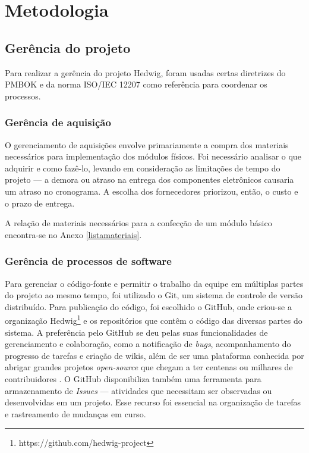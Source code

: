 \chapter{Metodologia}

\section{Gerência do projeto}

Para realizar a gerência do projeto Hedwig, foram usadas certas diretrizes do PMBOK \cite{pmi} e da norma ISO/IEC 12207 \cite{iso12207} como referência para coordenar os processos.

\subsection{Gerência de aquisição}

O gerenciamento de aquisições envolve primariamente a compra dos materiais necessários para implementação dos módulos físicos. Foi necessário analisar o que adquirir e como fazê-lo, levando em consideração as limitações de tempo do projeto --- a demora ou atraso na entrega dos componentes eletrônicos causaria um atraso no cronograma. A escolha dos fornecedores priorizou, então, o custo e o prazo de entrega.

A relação de materiais necessários para a confecção de um módulo básico encontra-se no Anexo \ref{listamateriais}.

\subsection{Gerência de processos de software}

Para gerenciar o código-fonte e permitir o trabalho da equipe em múltiplas partes do projeto ao mesmo tempo, foi utilizado o Git, um sistema de controle de versão distribuído. Para publicação do código, foi escolhido o GitHub, onde criou-se a organização Hedwig\footnote{https://github.com/hedwig-project} e os repositórios que contêm o código das diversas partes do sistema. A preferência pelo GitHub se deu pelas suas funcionalidades de gerenciamento e colaboração, como a notificação de \emph{bugs}, acompanhamento do progresso de tarefas e criação de wikis, além de ser uma plataforma conhecida por abrigar grandes projetos \emph{open-source} que chegam a ter centenas ou milhares de contribuidores \cite{github}. O GitHub disponibiliza também uma ferramenta para armazenamento de \emph{Issues} --- atividades que necessitam ser observadas ou desenvolvidas em um projeto. Esse recurso foi essencial na organização de tarefas e rastreamento de mudanças em curso.

